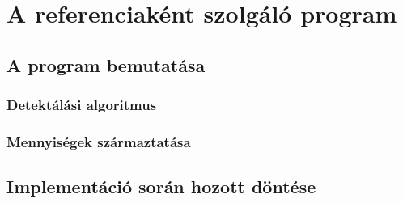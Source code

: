 \chapter{A referenciaként szolgáló program}

\section{A program bemutatása}


\subsection{Detektálási algoritmus}

\subsection{Mennyiségek származtatása}


\section{Implementáció során hozott döntése}
















